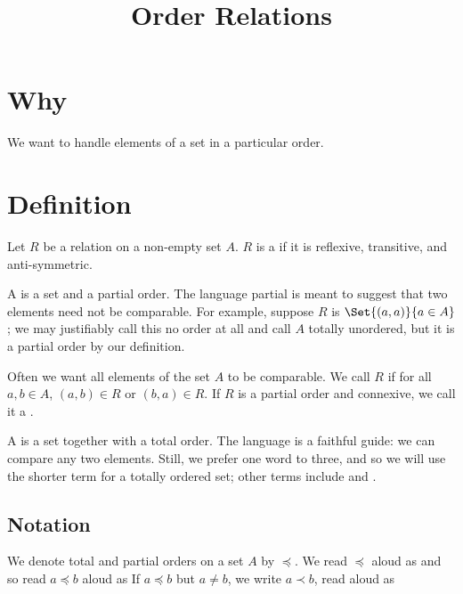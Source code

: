 






\title{Order Relations}

\section{Why}

We want to handle elements of a set in a particular order.

\section{Definition}

Let $R$ be a relation on a non-empty set $A$.
$R$ is a  if it is reflexive, transitive, and anti-symmetric.

A  is a set and a partial order.
The language partial is meant to suggest that two elements need not be comparable.
For example, suppose $R$ is $\Set{(a,a)}{a \in A}$; we may justifiably call this no order at all and call $A$ totally unordered, but it is a partial order by our definition.

Often we want all elements of the set $A$ to be comparable.
We call $R$  if for all $a, b \in A$, $(a, b) \in R$ or $(b, a) \in R$.
If $R$ is a partial order and connexive, we call it a .


A  is a set together with a total order.
The language is a faithful guide: we can compare any two elements.
Still, we prefer one word to three, and so we will use the shorter term  for a totally ordered set; other terms include  and .

\subsection{Notation}
We denote total and partial orders on a set $A$ by $\preceq$.
We read $\preceq$ aloud as  and so read $a\preceq b$ aloud as 
If $a \preceq b$ but $a \neq b$, we write $a \prec b$, read aloud as 


